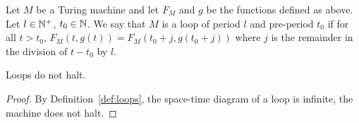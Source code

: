 







\begin{definition}[Loops]\label{def:loops}
    Let $M$ be a Turing machine and let $F_M$ and $g$ be the functions defined as above. Let $l \in \mathbb{N}^+$, $t_0 \in \mathbb{N}$.
    We say that $M$ is a loop of period $l$ and pre-period $t_0$ if for all $t > t_0$, $F_M(t,g(t)) = F_M(t_0 + j,g(t_0 + j))$ where $j$ is the remainder in the division of $t - t_0$ by $l$.
\end{definition}

\begin{lemma}\label{lem:loopdonthalt}
    Loops do not halt.
\end{lemma}
\begin{proof} By Definition~\ref{def:loops}, the space-time diagram of a loop is infinite, the machine does not halt.
\end{proof}

